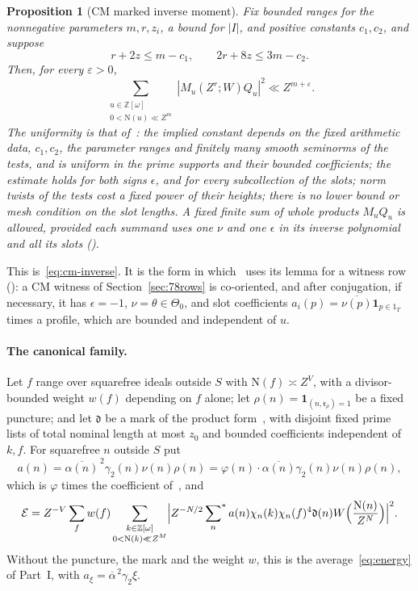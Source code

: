 \documentclass[11pt]{article}
\numberwithin{equation}{section}
\newcommand{\OO}{\mathbb Z[\omega]}
\newcommand{\N}{\mathrm N}
\newcommand{\ind}{\mathbf1}
\newcommand{\ssum}{\sideset{}{^*}\sum}
\newtheorem{proposition}{Proposition}
\begin{document}
\begin{proposition}[CM marked inverse moment]\label{prop:s4-marked}
Fix bounded ranges for the nonnegative parameters $m,r,z_i$, a bound for
$|I|$, and positive constants $c_1,c_2$, and suppose
\begin{equation}\label{eq:d172}
 r+2z\le m-c_1,\qquad 2r+8z\le3m-c_2 .
\end{equation}
Then, for every $\varepsilon>0$,
\begin{equation}\label{eq:s4-marked}
 \sum_{\substack{u\in\OO\\0<\N(u)\ll Z^m}}|M_u(Z^r;W)Q_u|^2\ll Z^{m+\varepsilon}.
\end{equation}
The uniformity is that of~\cite[Lemma~17.1]{OAI78}: the implied constant depends on the
fixed arithmetic data, $c_1,c_2$, the parameter ranges and finitely many smooth seminorms of the tests, and is
uniform in the prime supports and their bounded coefficients; the estimate holds for both signs $\epsilon$,
and for every subcollection of the slots; norm twists of the tests cost a fixed power of their heights; there is
no lower bound or mesh condition on the slot lengths. A fixed finite sum of whole products $M_uQ_u$ is
allowed, provided each summand uses one $\nu$ and one $\epsilon$ in its inverse polynomial and all its slots
(\cite[Section~17.1]{OAI78}).
\end{proposition}

This is~\eqref{eq:cm-inverse}. It is the form in which~\cite{OAI78} uses its lemma for a witness row
(\cite[Section~19.2]{OAI78}): a CM witness of Section~\ref{sec:78rows} is co-oriented, and after conjugation, if
necessary, it has $\epsilon=-1$, $\nu=\theta\in\Theta_0$, and slot coefficients
$a_i(p)=\overline{\nu(p)}\ind_{p\in 1_T}$ times a profile, which are bounded and independent of $u$.

\paragraph{The canonical family.} Let $f$ range over squarefree ideals outside $S$ with $\N(f)\asymp Z^V$, with a
divisor-bounded weight $w(f)$ depending on $f$ alone; let $\rho(n)=\ind_{(n,\mathfrak r_\rho)=1}$ be a fixed
puncture; and let $\mathfrak d$ be a mark of the product form~\cite[eq.~(14.1)]{OAI78}, with
disjoint fixed prime lists of total nominal length at most $z_0$ and bounded coefficients independent of
$k,f$. For squarefree $n$ outside $S$ put
\begin{equation}\label{eq:s4-a}
 a(n)=\overline{\alpha(n)}^{\,2}\gamma_2(n)\nu(n)\rho(n)=\varphi(n)\cdot\overline{\alpha(n)}\gamma_2(n)\nu(n)\rho(n),
\end{equation}
which is $\varphi$ times the coefficient of~\cite[eq.~(17.3)]{OAI78}, and
\begin{equation}\label{eq:s4-E}
 \mathcal E=Z^{-V}\sum_fw(f)\sum_{\substack{k\in\OO\\0<\N(k)\ll Z^M}}
 \Bigl|Z^{-N/2}\ssum_n a(n)\chi_n(k)\chi_n(f)^4\mathfrak d(n)W\Bigl(\frac{\N(n)}{Z^N}\Bigr)\Bigr|^2.
\end{equation}
Without the puncture, the mark and the weight $w$, this is the average~\eqref{eq:energy} of Part~I, with
$a_\xi=\overline\alpha^{\,2}\gamma_2\xi$.
\end{document}
